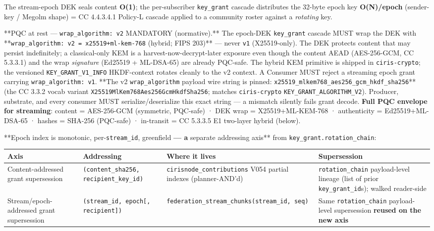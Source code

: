 \documentclass[11pt]{article}
\begin{document}
The stream-epoch DEK seals content \textbf{O(1)}; the per-subscriber \texttt{key\_grant} cascade distributes the 32-byte epoch key \textbf{O(N)/epoch} (sender-key / Megolm shape) = CC 4.4.3.4.1 Policy-L cascade applied to a community roster against a \textit{rotating} key.


**PQC at rest — \texttt{wrap\_algorithm: v2} MANDATORY (normative).** The epoch-DEK \texttt{key\_grant} cascade MUST wrap the DEK with **\texttt{wrap\_algorithm: v2 = x25519+ml-kem-768} (hybrid; FIPS 203)** — never \texttt{v1} (X25519-only). The DEK protects content that may persist indefinitely; a classical-only KEM is a harvest-now-decrypt-later exposure even though the content AEAD (AES-256-GCM, CC 5.3.3.1) and the wrap \textit{signature} (Ed25519 + ML-DSA-65) are already PQC-safe. The hybrid KEM primitive is shipped in \texttt{ciris-crypto}; the versioned \texttt{KEY\_GRANT\_V1\_INFO} HKDF-context rotates cleanly to the v2 context. A Consumer MUST reject a streaming epoch grant carrying \texttt{wrap\_algorithm: v1}. **The v2 \texttt{wrap\_algorithm} payload wire string is pinned: \texttt{x25519\_mlkem768\_aes256\_gcm\_hkdf\_sha256}** (the CC 3.3.2 vocab variant \texttt{X25519MlKem768Aes256GcmHkdfSha256}; matches \texttt{ciris-crypto} \texttt{KEY\_GRANT\_ALGORITHM\_V2}). Producer, substrate, and every consumer MUST serialize/deserialize this exact string — a mismatch silently fails grant decode. \textbf{Full PQC envelope for streaming}: content = AES-256-GCM (symmetric, PQC-safe) · DEK wrap = X25519+ML-KEM-768 · authenticity = Ed25519+ML-DSA-65 · hashes = SHA-256 (PQC-safe) · in-transit = CC 5.3.3.5 E1 two-layer hybrid (below).


**Epoch index is monotonic, per-\texttt{stream\_id}, greenfield\textbf{ — a }separate addressing axis** from \texttt{key\_grant.rotation\_chain}:


{\scriptsize
\begin{longtable}{|p{4.0cm}|p{4.0cm}|p{4.0cm}|p{4.0cm}|}\hline
\textbf{Axis} & \textbf{Addressing} & \textbf{Where it lives} & \textbf{Supersession} \\ \hline\endhead
Content-addressed grant supersession & \texttt{(content\_sha256, recipient\_key\_id)} & \texttt{cirisnode\_contributions} V054 partial indexes (planner-AND'd) & \texttt{rotation\_chain} payload-level lineage (list of prior \texttt{key\_grant\_id}s); walked reader-side \\ \hline
Stream/epoch-addressed grant supersession & \texttt{(stream\_id, epoch[, recipient])} & \texttt{federation\_stream\_chunks(stream\_id, seq)} & Same \texttt{rotation\_chain} payload-level supersession \textbf{reused on the new axis} \\ \hline
\end{longtable}}
\end{document}
